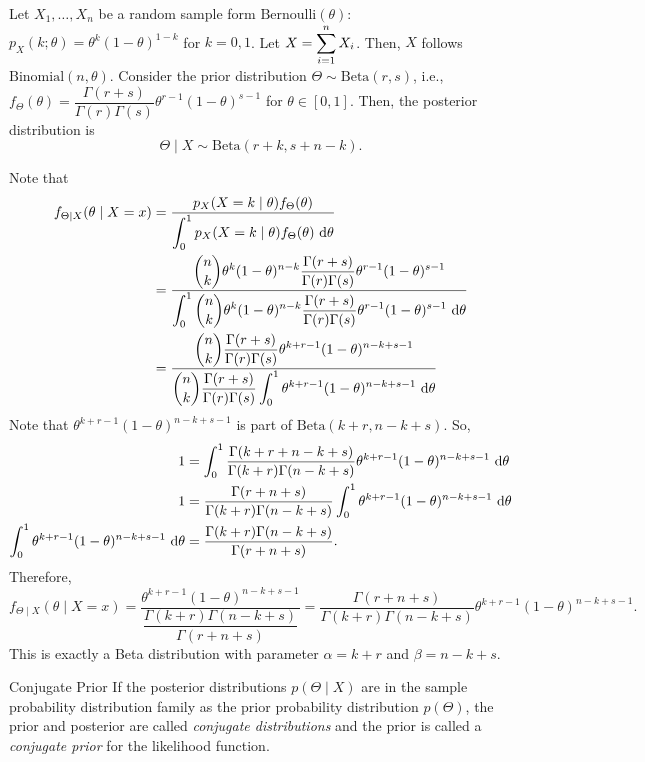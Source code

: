 \begin{eg}
	Let $X_1,\dots,X_n$ be a random sample form $\text{Bernoulli}(\theta)$: $p_X(k;\theta)=\theta^k(1-\theta)^{1-k}$ for $k=0,1$. Let $X=\displaystyle\sum_{i=1}^nX_i$. Then, $X$ follows $\text{Binomial}(n,\theta)$. Consider the prior distribution $\Theta\sim\text{Beta}(r,s)$, i.e., $f_\Theta(\theta)=\dfrac{\Gamma(r+s)}{\Gamma(r)\Gamma(s)}\theta^{r-1}(1-\theta)^{s-1}$ for $\theta\in[0,1]$. Then, the posterior distribution is \[\Theta\mid X\sim\text{Beta}(r+k, s+n-k).\]
	\begin{prf}
		Note that \begin{align*}f_{\Theta\mid X}(\theta\mid X=x)&=\dfrac{p_X(X=k\mid\theta)f_{\Theta}(\theta)}{\dsst\int_0^1p_X(X=k\mid\theta)f_{\Theta}(\theta)\ \d{\theta}}\\&=\dfrac{\dsst\binom{n}{k}\theta^k(1-\theta)^{n-k}\dfrac{\Gamma(r+s)}{\Gamma(r)\Gamma(s)}\theta^{r-1}(1-\theta)^{s-1}}{\dsst\int_0^1\dsst\binom{n}{k}\theta^k(1-\theta)^{n-k}\dfrac{\Gamma(r+s)}{\Gamma(r)\Gamma(s)}\theta^{r-1}(1-\theta)^{s-1}\ \d{\theta}}\\&=\dfrac{\dsst\binom{n}{k}\dfrac{\Gamma(r+s)}{\Gamma(r)\Gamma(s)}\theta^{k+r-1}(1-\theta)^{n-k+s-1}}{\dsst\binom{n}{k}\dfrac{\Gamma(r+s)}{\Gamma(r)\Gamma(s)}\int_0^1\theta^{k+r-1}(1-\theta)^{n-k+s-1}\ \d{\theta}}\end{align*}
		Note that $\theta^{k+r-1}(1-\theta)^{n-k+s-1}$ is part of $\text{Beta}(k+r,n-k+s)$.  So, \begin{align*}1&=\int_0^1\dfrac{\Gamma(k+r+n-k+s)}{\Gamma(k+r)\Gamma(n-k+s)}\theta^{k+r-1}(1-\theta)^{n-k+s-1}\ \d{\theta}\\1&=\dfrac{\Gamma(r+n+s)}{\Gamma(k+r)\Gamma(n-k+s)}\int_0^1\theta^{k+r-1}(1-\theta)^{n-k+s-1}\ \d{\theta}\\\int_0^1\theta^{k+r-1}(1-\theta)^{n-k+s-1}\ \d{\theta}&=\dfrac{\Gamma(k+r)\Gamma(n-k+s)}{\Gamma(r+n+s)}.\end{align*} Therefore, \[f_{\Theta\mid X}(\theta\mid X=x)=\dfrac{\theta^{k+r-1}(1-\theta)^{n-k+s-1}}{\dfrac{\Gamma(k+r)\Gamma(n-k+s)}{\Gamma(r+n+s)}}=\dfrac{\Gamma(r+n+s)}{\Gamma(k+r)\Gamma(n-k+s)}\theta^{k+r-1}(1-\theta)^{n-k+s-1}.\] This is exactly a Beta distribution with parameter $\alpha=k+r$ and $\beta=n-k+s$.
	\end{prf}
\end{eg}
\begin{df}{Conjugate Prior}
	If the posterior distributions $p(\Theta\mid X)$ are in the sample probability distribution family as the prior probability distribution $p(\Theta)$, the prior and posterior are called \textit{conjugate distributions} and the prior is called a \textit{conjugate prior} for the likelihood function.	
\end{df}
